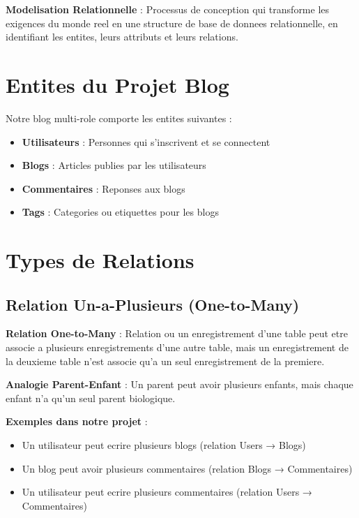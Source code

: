 \documentclass[a4paper,12pt]{book}
\begin{document}
\begin{definitionbox}
    \textbf{Modelisation Relationnelle} : Processus de conception qui transforme les exigences du monde reel en une structure de base de donnees relationnelle, en identifiant les entites, leurs attributs et leurs relations.
\end{definitionbox}

\section{Entites du Projet Blog}

Notre blog multi-role comporte les entites suivantes :

\begin{itemize}
    \item \textbf{Utilisateurs} : Personnes qui s'inscrivent et se connectent
    \item \textbf{Blogs} : Articles publies par les utilisateurs
    \item \textbf{Commentaires} : Reponses aux blogs
    \item \textbf{Tags} : Categories ou etiquettes pour les blogs
\end{itemize}

\section{Types de Relations}

\subsection{Relation Un-a-Plusieurs (One-to-Many)}

\begin{definitionbox}
    \textbf{Relation One-to-Many} : Relation ou un enregistrement d'une table peut etre associe a plusieurs enregistrements d'une autre table, mais un enregistrement de la deuxieme table n'est associe qu'a un seul enregistrement de la premiere.
\end{definitionbox}

\begin{analogybox}
    \textbf{Analogie Parent-Enfant} : Un parent peut avoir plusieurs enfants, mais chaque enfant n'a qu'un seul parent biologique.
\end{analogybox}

\textbf{Exemples dans notre projet} :
\begin{itemize}
    \item Un utilisateur peut ecrire plusieurs blogs (relation Users → Blogs)
    \item Un blog peut avoir plusieurs commentaires (relation Blogs → Commentaires)
    \item Un utilisateur peut ecrire plusieurs commentaires (relation Users → Commentaires)
\end{itemize}
\end{document}
